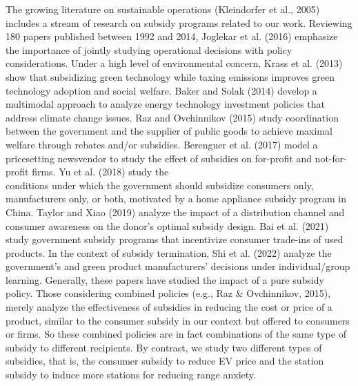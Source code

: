 \documentclass[10pt]{article}
\begin{document}
The growing literature on sustainable operations (Kleindorfer et al., 2005) includes a stream of research on subsidy programs related to our work. Reviewing 180 papers published between 1992 and 2014, Joglekar et al. (2016) emphasize the importance of jointly studying operational decisions with policy considerations. Under a high level of environmental concern, Krass et al. (2013) show that subsidizing green technology while taxing emissions improves green technology adoption and social welfare. Baker and Solak (2014) develop a multimodal approach to analyze energy technology investment policies that address climate change issues. Raz and Ovchinnikov (2015) study coordination between the government and the supplier of public goods to achieve maximal welfare through rebates and/or subsidies. Berenguer et al. (2017) model a pricesetting newsvendor to study the effect of subsidies on for-profit and not-for-profit firms. Yu et al. (2018) study the\\
conditions under which the government should subsidize consumers only, manufacturers only, or both, motivated by a home appliance subsidy program in China. Taylor and Xiao (2019) analyze the impact of a distribution channel and consumer awareness on the donor's optimal subsidy design. Bai et al. (2021) study government subsidy programs that incentivize consumer trade-ins of used products. In the context of subsidy termination, Shi et al. (2022) analyze the government's and green product manufacturers' decisions under individual/group learning. Generally, these papers have studied the impact of a pure subsidy policy. Those considering combined policies (e.g., Raz \& Ovchinnikov, 2015), merely analyze the effectiveness of subsidies in reducing the cost or price of a product, similar to the consumer subsidy in our context but offered to consumers or firms. So these combined policies are in fact combinations of the same type of subsidy to different recipients. By contrast, we study two different types of subsidies, that is, the consumer subsidy to reduce EV price and the station subsidy to induce more stations for reducing range anxiety.
\end{document}
